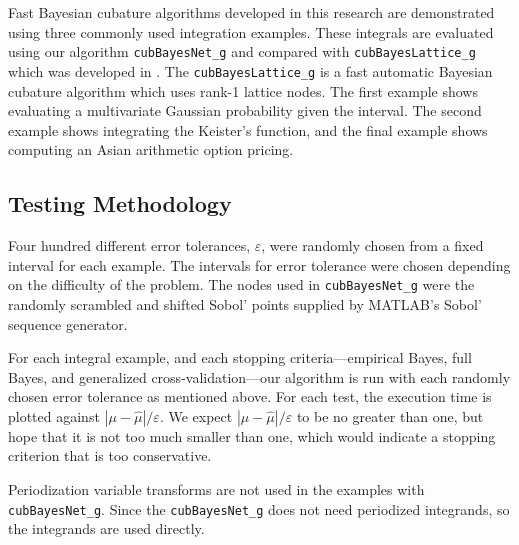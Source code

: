 \documentclass[graybox,footinfo]{svmult}
\newcommand{\hmu}{\widehat{\mu}}
\newcommand{\code}[1]{\texttt{#1}}
\def\abs#1{\ensuremath{\left \lvert #1 \right \rvert}}
\newcommand\secref{Section~\ref}
\begin{document}
Fast Bayesian cubature algorithms developed in this research are demonstrated using three commonly used integration examples.
These integrals are evaluated using our algorithm \code{cubBayesNet\_g} and compared with \code{cubBayesLattice\_g} which was developed in \cite{RatHic19a}. The \code{cubBayesLattice\_g} is a fast automatic Bayesian cubature algorithm which uses rank-1 lattice nodes. The first example shows evaluating a multivariate Gaussian probability given the interval. The second example shows integrating the Keister's function, and the final example shows computing an Asian arithmetic option pricing.  


\subsection{Testing Methodology}
\label{sec:numerical_experiments_cubBayesLattice}

Four hundred different error tolerances, $\varepsilon$, were randomly chosen from a fixed interval  for each example. 
The intervals for error tolerance were chosen depending on the difficulty of the problem.
The nodes used in \code{cubBayesNet\_g} were the randomly scrambled and shifted Sobol' points supplied by MATLAB's Sobol' sequence generator. 

For each integral example, and each stopping criteria---empirical Bayes, full Bayes, and generalized cross-validation---our algorithm is run with each randomly chosen error tolerance as mentioned above.  For each test, the execution time is plotted against $\abs{\mu - \hmu}/\varepsilon$.  We expect $\abs{\mu - \hmu}/\varepsilon$ to be no greater than one, but hope that it is not too much smaller than one, which would indicate a stopping criterion that is too conservative.


Periodization variable transforms are not used in the examples with \\ \allowbreak \code{cubBayesNet\_g}. Since the \allowbreak \code{cubBayesNet\_g} does not need periodized integrands, so the integrands are used directly.

\end{document}
